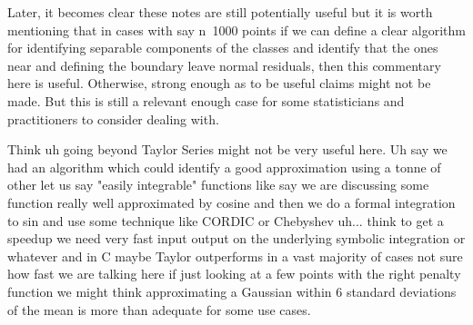 Later, it becomes clear these notes are still potentially useful but it is worth mentioning that in cases with say n~1000 points if we can define a clear algorithm for identifying separable components of the classes and identify that the ones near and defining the boundary leave normal residuals, then this commentary here is useful. Otherwise, strong enough as to be useful claims might not be made. But this is still a relevant enough case for some statisticians and practitioners to consider dealing with.

Think uh going beyond Taylor Series might not be very useful here. Uh say we had an algorithm which could identify a good approximation using a tonne of other let us say "easily integrable" functions like say we are discussing some function really well approximated by cosine and then we do a formal integration to sin and use some technique like CORDIC or Chebyshev uh... think to get a speedup we need very fast input output on the underlying symbolic integration or whatever and in C maybe Taylor outperforms in a vast majority of cases not sure how fast we are talking here if just looking at a few points with the right penalty function we might think approximating a Gaussian within 6 standard deviations of the mean is more than adequate for some use cases.

